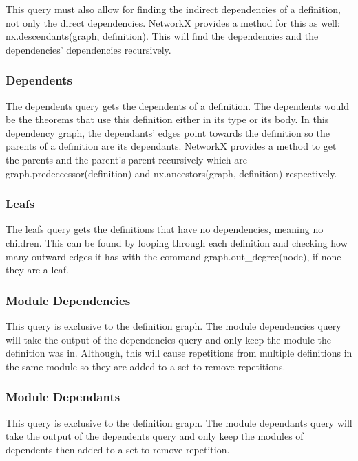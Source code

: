 This query must also allow for finding the indirect dependencies of a
definition, not only the direct dependencies. NetworkX provides a method for
this as well: \textsf{nx.descendants(graph, definition)}. This will find the
dependencies and the dependencies' dependencies recursively.

\subsubsection{Dependents}

The dependents query gets the dependents of a definition. The dependents would
be the theorems that use this definition either in its type or its body. In
this dependency graph, the dependants' edges point towards the definition so
the parents of a definition are its dependants. NetworkX provides a method to
get the parents and the parent's parent recursively which are
\textsf{graph.predeccessor(definition)} and \textsf{nx.ancestors(graph,
definition)} respectively.

\subsubsection{Leafs}

The leafs query gets the definitions that have no dependencies, meaning no
children. This can be found by looping through each definition and checking how
many outward edges it has with the command \textsf{graph.out\_degree(node)}, if none
they are a leaf.

\subsubsection{Module Dependencies}

This query is exclusive to the definition graph. The module dependencies query
will take the output of the dependencies query and only keep the module the
definition was in. Although, this will cause repetitions from multiple
definitions in the same module so they are added to a set to remove
repetitions.

\subsubsection{Module Dependants}

This query is exclusive to the definition graph. The module dependants query will take the output of the dependents query and
only keep the modules of dependents then added to a set to remove repetition.

